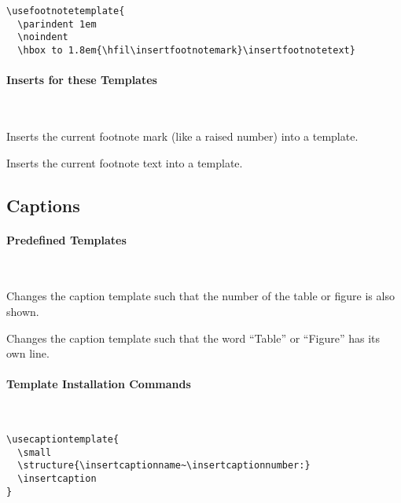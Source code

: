 \begin{command}{\usefootnotetemplate{}}
  \example
\begin{verbatim}
\usefootnotetemplate{
  \parindent 1em
  \noindent
  \hbox to 1.8em{\hfil\insertfootnotemark}\insertfootnotetext}
\end{verbatim}
\end{command}


\paragraph{Inserts for these Templates}\

\begin{command}{\insertfootnotemark}
  Inserts the current footnote mark (like a raised number) into a
  template. 
\end{command}

\begin{command}{\insertfootnotetext}
  Inserts the current footnote text into a template. 
\end{command}





\subsection{Captions}
\label{section-template-caption}

\paragraph{Predefined Templates}\

\begin{command}{\beamertemplatecaptionwithnumber}
  Changes the caption template such that the number of the
  table or figure is also shown.
\end{command}

\begin{command}{\beamertemplatecaptionownline}
  Changes the caption template such that the word ``Table''
  or ``Figure'' has its own line.
\end{command}



\paragraph{Template Installation Commands}\

\begin{command}{\usecaptiontemplate{}}
  \example
\begin{verbatim}
\usecaptiontemplate{
  \small
  \structure{\insertcaptionname~\insertcaptionnumber:}
  \insertcaption
}
\end{verbatim}
\end{command}



